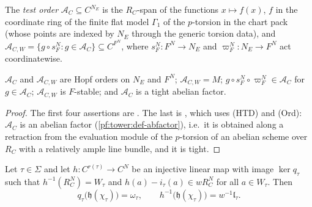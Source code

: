 \begin{definition}\label{pf:tower:def-testord}
The \emph{test order} $\mathcal A_C\subseteq C^{N_E}$ is the $R_C$-span of the functions $x\mapsto f(x)$, $f$ in the coordinate
ring of the finite flat model $\Gamma_1$ of the $p$-torsion in the chart pack (whose points are indexed by $N_E$ through the
generic torsion data), and $\mathcal A_{C,W}=\{g\circ s_F^N:g\in\mathcal A_C\}\subseteq C^{F^N}$, where
$s_F^N\colon F^N\to N_E$ and $\varpi_F^N\colon N_E\to F^N$ act coordinatewise.
\end{definition}

\begin{lemma}\label{pf:tower:testord}
$\mathcal A_C$ and $\mathcal A_{C,W}$ are Hopf orders on $N_E$ and $F^N$; $\mathcal A_{C,W}=M$; $g\circ s_F^N\circ\varpi_F^N\in\mathcal A_C$
for $g\in\mathcal A_C$; $\mathcal A_{C,W}$ is $F$-stable; and $\mathcal A_C$ is a tight abelian factor.
\end{lemma}

\begin{proof}
The first four assertions are . The last is
, which uses (HTD) and (Ord): $\mathcal A_C$ is an abelian factor
(\cref{pf:tower:def-abfactor}), i.e.\ it is obtained along a retraction from the evaluation module of the $p$-torsion of an
abelian scheme over $R_C$ with a relatively ample line bundle, and it is tight.
\end{proof}

\begin{theorem}\label{pf:tower:relay}
Let $\tau\in\Sigma$ and let $h\colon C^{r(\tau)}\to C^N$ be an injective linear map with image $\ker q_\tau$ such that
$h^{-1}(R_C^N)=W_\tau$ and $h(a)-i_\tau(a)\in wR_C^N$ for all $a\in W_\tau$. Then
\[
q_\tau\bigl(\mathfrak h(\chi_\tau)\bigr)=\omega_\tau,\qquad h^{-1}\bigl(\mathfrak h(\chi_\tau)\bigr)=w^{-1}\mathfrak l_\tau .
\]
\end{theorem}

